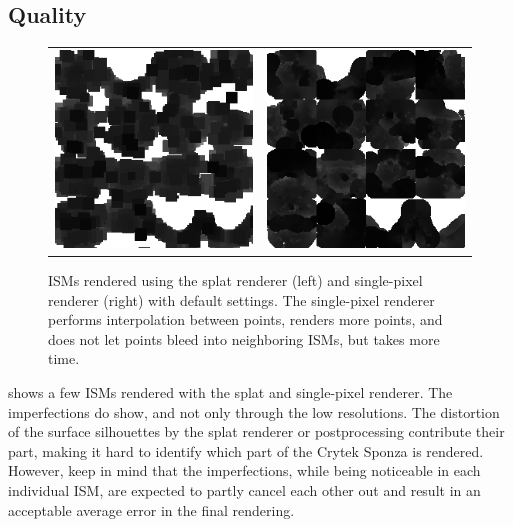 \subsection{Quality}
\label{sec:results:ism:quality}

\begin{figure}[htb]
\centering
  \begin{tabular}{@{}cc@{}}
    \includegraphics[width=.48\textwidth]{screenshots/ism_splat_cropped} &
    \includegraphics[width=.48\textwidth]{screenshots/ism_single_pixel_cropped}
  \end{tabular}
  \caption{ISMs rendered using the splat renderer (left) and single-pixel renderer (right) with default settings. The single-pixel renderer performs interpolation between points, renders more points, and does not let points bleed into neighboring ISMs, but takes more time.}
  \label{fig:results:isms}
\end{figure}

\noindent
{} shows a few ISMs rendered with the splat and single-pixel renderer. The imperfections do show, and not only through the low resolutions. The distortion of the surface silhouettes by the splat renderer or postprocessing contribute their part, making it hard to identify which part of the Crytek Sponza is rendered. However, keep in mind that the imperfections, while being noticeable in each individual ISM, are expected to partly cancel each other out and result in an acceptable average error in the final rendering.

